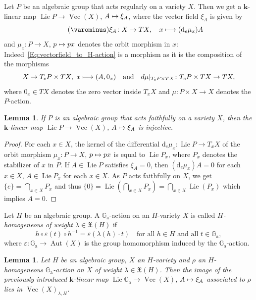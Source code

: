 \documentclass[JEP,XML,SOM,Unicode]{cedram}
\def\mto{\mathchoice{\longmapsto}{\mapsto}{\mapsto}{\mapsto}}
\newcommand{\ra}{\mathrm{a}}
\theoremstyle{plain}
\newtheorem{lemma}[theorem]{Lemma}
\theoremstyle{definition}
\DeclareMathOperator{\Lie}{Lie}
\DeclareMathOperator{\Aut}{Aut}
\DeclareMathOperator{\Ve}{Vec}
\newcommand{\GG}{\mathbb{G}}
\newcommand{\kk}{{\boldsymbol{k}}}
\begin{document}
Let $P$ be an algebraic group that acts regularly on a variety $X$.
Then we get a $\kk$-linear map $\Lie P \to \Ve(X)$,
$A \mto \xi_A$, where the vector field $\xi_A$ is given by
\[
\label{Eq:vectorfield_to_H-action}
\tag{$\varominus$}
\xi_A \colon X \to TX, \quad x \mto (\textrm{d}_e \mu_x) A
\]
and $\mu_x \colon P \to X$, $p \mto p x$ denotes the orbit morphism in $x$: Indeed~\eqref{Eq:vectorfield_to_H-action} is a morphism as it is the composition of the morphisms
\[
X \to T_e P \times TX, \ x \mto (A, 0_x) \quad \textrm{and} \quad
d \mu |_{T_e P \times TX} \colon T_e P \times TX \to TX,
\]
where $0_x \in TX$ denotes the zero vector inside $T_x X$ and
$\mu \colon P \times X \to X$ denotes the $P$-action.

\begin{lemma}
\label{lem.faithfull_action}
If $P$ is an algebraic group that acts faithfully on a variety $X$, then the
$\kk$-linear map $\Lie P \to \Ve(X)$, $A \mto \xi_A$ is injective.
\end{lemma}

\begin{proof}
For each $x \in X$, the kernel of the differential $\textrm{d}_e \mu_x \colon \Lie P \to T_x X$ of
the orbit morphism $\mu_x \colon P \to X$, $p \mto p x$ is equal to $\Lie P_x$, where
$P_x$ denotes the stabilizer of $x$ in $P$. If $A \in \Lie P$ satisfies $\xi_A = 0$, then
$(\textrm{d}_e \mu_x)A = 0$ for each $x \in X$, \ie $A \in \Lie P_x$ for each $x \in X$.
As $P$ acts faithfully on $X$, we get $\{e\} = \bigcap_{x \in X} P_x$ and thus
$\{0\} = \Lie( \bigcap_{x \in X} P_x ) = \bigcap_{x \in X} \Lie(P_ x)$ which implies $A = 0$.
\end{proof}

Let $H$ be an algebraic group. A $\GG_\ra$-action on an $H$-variety $X$ is called
\emph{$H$-homo\-geneous of weight $\lambda \in \mathfrak{X}(H)$} if
\[
h \circ \varepsilon(t) \circ h^{-1} = \varepsilon(\lambda(h) \cdot t) \quad
\textrm{for all $h \in H$ and all $t \in \GG_\ra$},
\]
where $\varepsilon \colon \GG_\ra \to \Aut(X)$ is the group homomorphism
induced by the $\GG_\ra$-action.

\begin{lemma}
\label{lem.H-homogeneous_Ga-action}
Let $H$ be an algebraic group, $X$ an $H$-variety and
$\rho$ an $H$-homo\-ge\-neous $\GG_\ra$-action on $X$
of weight $\lambda \in \mathfrak{X}(H)$. Then the image
of the previously introduced $\kk$\nobreakdash-linear map
$\Lie \GG_\ra \to \Ve(X)$, $A \mto \xi_A$ associated to $\rho$
lies in $\Ve(X)_{\lambda, H}$.
\end{lemma}
\end{document}
